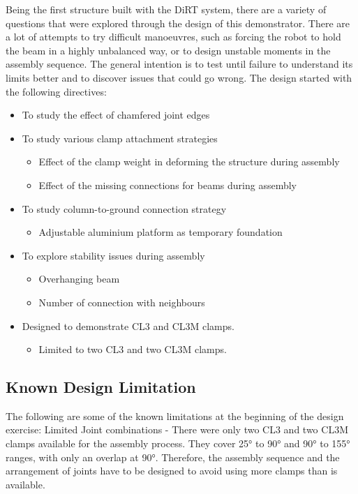 Being the first structure built with the DiRT system, there are a variety of questions that were explored through the design of this demonstrator. There are a lot of attempts to try difficult manoeuvres, such as forcing the robot to hold the beam in a highly unbalanced way, or to design unstable moments in the assembly sequence. The general intention is to test until failure to understand its limits better and to discover issues that could go wrong. The design started with the following directives:
\begin{itemize}
    \item To study the effect of chamfered joint edges
    \item To study various clamp attachment strategies
    \begin{itemize}
        \item Effect of the clamp weight in deforming the structure during assembly
        \item Effect of the missing connections for beams during assembly
    \end{itemize}
    \item To study column-to-ground connection strategy
    \begin{itemize}
        \item Adjustable aluminium platform as temporary foundation
    \end{itemize}
    \item To explore stability issues during assembly
    \begin{itemize}
        \item Overhanging beam
        \item Number of connection with neighbours
    \end{itemize}
    \item Designed to demonstrate CL3 and CL3M clamps.
    \begin{itemize}
        \item Limited to two CL3 and two CL3M clamps.
    \end{itemize}
\end{itemize}

\subsection{Known Design Limitation}
\label{subsection:exploration-2-known-design-limitation}

The following are some of the known limitations at the beginning of the design exercise:
Limited Joint combinations - There were only two CL3 and two CL3M clamps available for the assembly process. They cover 25° to 90° and 90° to 155° ranges, with only an overlap at 90°. Therefore, the assembly sequence and the arrangement of joints have to be designed to avoid using more clamps than is available.

